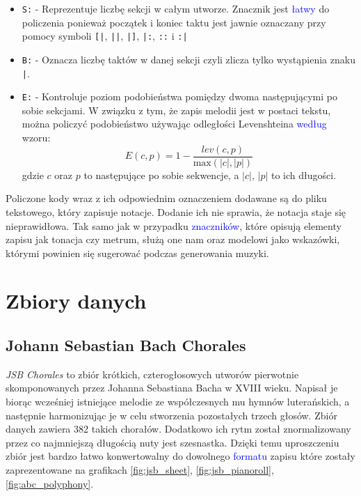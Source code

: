 \documentclass[data-science]{agh-wi} %
\begin{document}
\begin{itemize}
    \item \texttt{S:} - Reprezentuje liczbę sekcji w całym utworze. Znacznik jest \textcolor{blue}{łatwy} do policzenia ponieważ początek i koniec taktu jest jawnie oznaczany przy pomocy symboli \texttt{[|}, \texttt{||}, \texttt{|]}, \texttt{|:}, \texttt{::} i \texttt{:|}
    \item \texttt{B:} - Oznacza liczbę taktów w danej sekcji czyli zlicza tylko wystąpienia znaku \texttt{|}.
    \item \texttt{E:} - Kontroluje poziom podobieństwa pomiędzy dwoma następującymi po sobie sekcjami. W związku z tym, że zapis melodii jest w postaci tekstu, można policzyć podobieństwo używając odległości Levenshteina \textcolor{blue}{według} wzoru:
          \begin{equation}
              E(c,p) = 1 - \dfrac{lev(c, p)}{\text{max}(|c|, |p|)}
          \end{equation}
          gdzie $c$ oraz $p$ to następujące po sobie sekwencje, a $|c|$, $|p|$ to ich długości.
\end{itemize}

Policzone kody wraz z ich odpowiednim oznaczeniem dodawane są do pliku tekstowego, który zapisuje notacje. Dodanie ich nie sprawia, że notacja staje się nieprawidłowa. Tak samo jak w przypadku \textcolor{blue}{znaczników}, które opisują elementy zapisu jak tonacja czy metrum, służą one nam oraz modelowi jako wskazówki, którymi powinien się sugerować podczas generowania muzyki.

\section{Zbiory danych}

\subsection{Johann Sebastian Bach Chorales}
\textit{JSB Chorales} \cite{bachchorales} to zbiór krótkich, czterogłosowych utworów pierwotnie skomponowanych przez Johanna Sebastiana Bacha w XVIII wieku. Napisał je biorąc wcześniej istniejące melodie ze współczesnych mu hymnów luterańskich, a następnie harmonizując je w celu stworzenia pozostałych trzech głosów. Zbiór danych zawiera 382 takich chorałów. Dodatkowo ich rytm został znormalizowany przez co najmniejszą długością nuty jest szesnastka. Dzięki temu uproszczeniu zbiór jest bardzo łatwo konwertowalny do dowolnego \textcolor{blue}{formatu} zapisu które zostały zaprezentowane na grafikach \ref*{fig:jsb_sheet}, \ref*{fig:jsb_pianoroll}, \ref*{fig:abc_polyphony}.
\end{document}
